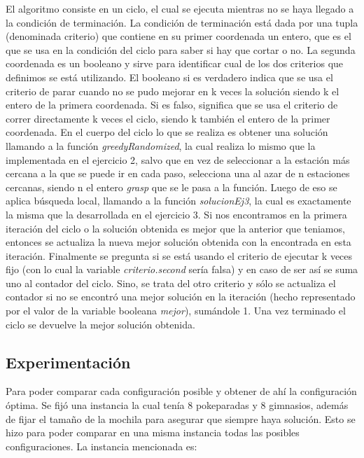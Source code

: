         El algoritmo consiste en un ciclo, el cual se ejecuta mientras no se haya llegado a la condición de terminación. La condición de terminación está dada por una tupla (denominada criterio) que contiene en su primer coordenada un entero, que es el que se usa en la condición del ciclo para saber si hay que cortar o no. La segunda coordenada es un booleano y sirve para identificar cual de los dos criterios que definimos se está utilizando. El booleano si es verdadero indica que se usa el criterio de parar cuando no se pudo mejorar en k veces la solución siendo k el entero de la primera coordenada. Si es falso, significa que se usa el criterio de correr directamente k veces el ciclo, siendo k también el entero de la primer coordenada.
        En el cuerpo del ciclo lo que se realiza es obtener una solución llamando a la función \textit{greedyRandomized}, la cual realiza lo mismo que la implementada en el ejercicio 2, salvo que en vez de seleccionar a la estación más cercana a la que se puede ir en cada paso, selecciona una al azar de n estaciones cercanas, siendo n el entero \textit{grasp} que se le pasa a la función. Luego de eso se aplica búsqueda local, llamando a la función \textit{solucionEj3}, la cual es exactamente la misma que la desarrollada en el ejercicio 3. Si nos encontramos en la primera iteración del ciclo o la solución obtenida es mejor que la anterior que teniamos, entonces se actualiza la nueva mejor solución obtenida con la encontrada en esta iteración.
        Finalmente se pregunta si se está usando el criterio de ejecutar k veces fijo (con lo cual la variable \textit{criterio.second} sería falsa) y en caso de ser así se suma uno al contador del ciclo. Sino, se trata del otro criterio y sólo se actualiza el contador si no se encontró una mejor solución en la iteración (hecho representado por el valor de la variable booleana \textit{mejor}), sumándole 1.
        Una vez terminado el ciclo se devuelve la mejor solución obtenida.

  \subsection{Experimentación}

    Para poder comparar cada configuración posible y obtener de ahí la configuración óptima. Se fijó una instancia la cual tenía 8 pokeparadas y 8 gimnasios, además de fijar el tamaño de la mochila para asegurar que siempre haya solución. Esto se hizo para poder comparar en una misma instancia todas las posibles configuraciones. La instancia mencionada es:

